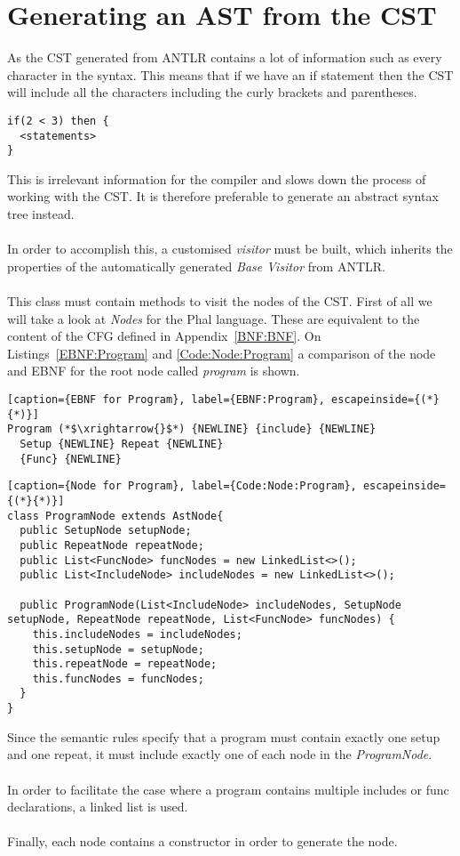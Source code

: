 \section{Generating an AST from the CST}
As the CST generated from ANTLR contains a lot of information such as every character in the syntax. This means that if we have an if statement then the CST will include all the characters including the curly brackets and parentheses.
\begin{lstlisting}[caption={An if statement in PHAL}]
if(2 < 3) then {
  <statements>
}
\end{lstlisting}
This is irrelevant information for the compiler and slows down the process of working with the CST. It is therefore preferable to generate an abstract syntax tree instead.
\\\\
In order to accomplish this, a customised \textit{visitor} must be built, which inherits the properties of the automatically generated \textit{Base Visitor} from ANTLR.
\\\\
This class must contain methods to visit the nodes of the CST.
First of all we will take a look at \textit{Nodes} for the Phal language.
These are equivalent to the content of the CFG defined in Appendix~\ref{BNF:BNF}.
On Listings~\ref{EBNF:Program} and \ref{Code:Node:Program} a comparison of the node and EBNF for the root node called \textit{program} is shown.

\begin{lstlisting}[caption={EBNF for Program}, label={EBNF:Program}, escapeinside={(*}{*)}]
Program (*$\xrightarrow{}$*) {NEWLINE} {include} {NEWLINE} 
  Setup {NEWLINE} Repeat {NEWLINE} 
  {Func} {NEWLINE}
\end{lstlisting}

\begin{lstlisting}[caption={Node for Program}, label={Code:Node:Program}, escapeinside={(*}{*)}]
class ProgramNode extends AstNode{
  public SetupNode setupNode;
  public RepeatNode repeatNode;
  public List<FuncNode> funcNodes = new LinkedList<>();
  public List<IncludeNode> includeNodes = new LinkedList<>();
	
  public ProgramNode(List<IncludeNode> includeNodes, SetupNode setupNode, RepeatNode repeatNode, List<FuncNode> funcNodes) {
    this.includeNodes = includeNodes;
    this.setupNode = setupNode;
    this.repeatNode = repeatNode;
    this.funcNodes = funcNodes;
  }
}
\end{lstlisting}
Since the semantic rules specify that a program must contain exactly one setup and one repeat, it must include exactly one of each node in the \textit{ProgramNode}.
\\\\
In order to facilitate the case where a program contains multiple includes or func declarations, a linked list is used.
\\\\
Finally, each node contains a constructor in order to generate the node.

